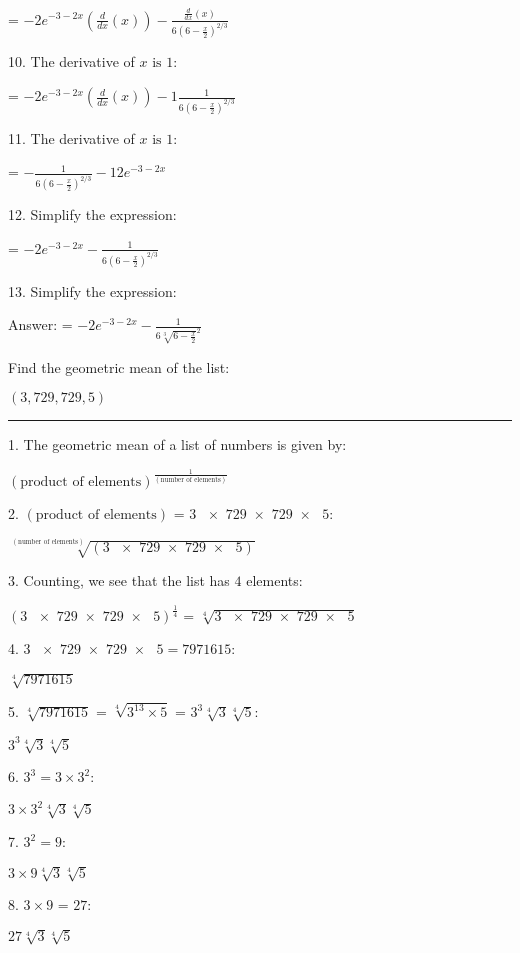 \documentclass{article}
\begin{document}
= $-2 e^{-3-2 x} \left(\frac{d}{dx}(x)\right)-\frac{\frac{d}{dx}(x)}{6 \left(6-\frac{x}{2}\right)^{2/3}}$

10. The derivative of $x\text{ is }1:$

= $-2 e^{-3-2 x} \left(\frac{d}{dx}(x)\right)-1 \frac{1}{6 \left(6-\frac{x}{2}\right)^{2/3}}$

11. The derivative of $x\text{ is }1:$

= $-\frac{1}{6 \left(6-\frac{x}{2}\right)^{2/3}}-1 2 e^{-3-2 x}$

12. Simplify the expression:

= $-2 e^{-3-2 x}-\frac{1}{6 \left(6-\frac{x}{2}\right)^{2/3}}$

13. Simplify the expression:

Answer: = $-2 e^{-3-2 x}-\frac{1}{6 \sqrt[3]{6-\frac{x}{2}}^2}$

\pagebreak

Find the geometric mean of the list:

$(3,729,729,5)$

\hrule

1. The geometric mean of a list of numbers is given by:

$(\text{product of elements})^{\frac{1}{(\text{number of elements})}}$

2. $(\text{product of elements})\text{ = }3\text{ $\times $ 729 $\times $ 729 $\times $ }5:$

$\sqrt[(\text{number of elements})]{(3\text{ $\times $ 729 $\times $ 729 $\times $ }5)}$

3. Counting, we see that the list has $4$ elements:

$(3\text{ $\times $ 729 $\times $ 729 $\times $ }5)^{\frac{1}{4}}\text{ = }\sqrt[4]{3\text{ $\times $ 729 $\times $ 729 $\times $ }5}$

4. $3\text{ $\times $ 729 $\times $ 729 $\times $ }5=7971615:$

$\sqrt[4]{7971615}$

5. $\sqrt[4]{7971615}\text{ = }\sqrt[4]{3^{13}\times 5}\text{ = }3^3 \sqrt[4]{3} \sqrt[4]{5}$:

$3^3 \sqrt[4]{3} \sqrt[4]{5}$

6. $3^3=3\times 3^2:$

$3\times 3^2 \sqrt[4]{3} \sqrt[4]{5}$

7. $3^2=9:$

$3\times 9 \sqrt[4]{3} \sqrt[4]{5}$

8. $3\times 9\text{ = }27:$

$27 \sqrt[4]{3} \sqrt[4]{5}$
\end{document}
